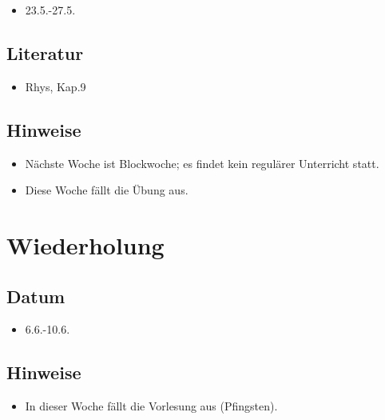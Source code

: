 \documentclass[
]{book}
\providecommand{\tightlist}{%
  \setlength{\itemsep}{0pt}\setlength{\parskip}{0pt}}
\begin{document}
\begin{itemize}
\tightlist
\item
  23.5.-27.5.
\end{itemize}

\hypertarget{literatur-10}{%
\subsection{Literatur}\label{literatur-10}}

\begin{itemize}
\tightlist
\item
  Rhys, Kap.9
\end{itemize}

\hypertarget{hinweise-3}{%
\subsection{Hinweise}\label{hinweise-3}}

\begin{itemize}
\tightlist
\item
  Nächste Woche ist Blockwoche; es findet kein regulärer Unterricht statt.
\item
  Diese Woche fällt die Übung aus.
\end{itemize}

\hypertarget{wiederholung-1}{%
\section{Wiederholung}\label{wiederholung-1}}

\hypertarget{datum-11}{%
\subsection{Datum}\label{datum-11}}

\begin{itemize}
\tightlist
\item
  6.6.-10.6.
\end{itemize}

\hypertarget{hinweise-4}{%
\subsection{Hinweise}\label{hinweise-4}}

\begin{itemize}
\tightlist
\item
  In dieser Woche fällt die Vorlesung aus (Pfingsten).
\end{itemize}
\end{document}
